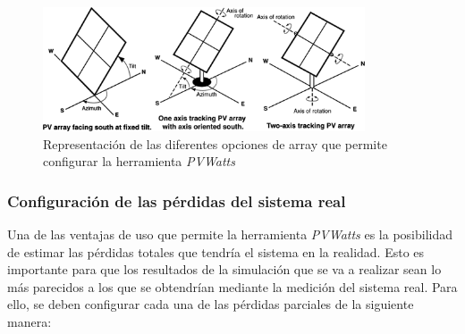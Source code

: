 \begin{figure}[H]
    \centering
    \includegraphics[width=0.85\textwidth]{img/diseno/array.png}
    \caption{Representación de las diferentes opciones de array que permite configurar la herramienta \textit{PVWatts} \cite{pvwatts}}
    \label{fig:array}
\end{figure}

\subsubsection{Configuración de las pérdidas del sistema real}

Una de las ventajas de uso que permite la herramienta \textit{PVWatts} es la posibilidad de estimar las pérdidas totales que tendría el sistema en la realidad. Esto es importante para que los resultados de la simulación que se va a realizar sean lo más parecidos a los que se obtendrían mediante la medición del sistema real. Para ello, se deben configurar cada una de las pérdidas parciales de la siguiente manera:

